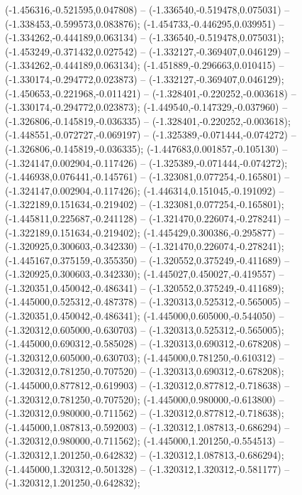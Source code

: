  (-1.456316,-0.521595,0.047808) -- (-1.336540,-0.519478,0.075031) -- (-1.338453,-0.599573,0.083876);
 (-1.454733,-0.446295,0.039951) -- (-1.334262,-0.444189,0.063134) -- (-1.336540,-0.519478,0.075031);
 (-1.453249,-0.371432,0.027542) -- (-1.332127,-0.369407,0.046129) -- (-1.334262,-0.444189,0.063134);
 (-1.451889,-0.296663,0.010415) -- (-1.330174,-0.294772,0.023873) -- (-1.332127,-0.369407,0.046129);
 (-1.450653,-0.221968,-0.011421) -- (-1.328401,-0.220252,-0.003618) -- (-1.330174,-0.294772,0.023873);
 (-1.449540,-0.147329,-0.037960) -- (-1.326806,-0.145819,-0.036335) -- (-1.328401,-0.220252,-0.003618);
 (-1.448551,-0.072727,-0.069197) -- (-1.325389,-0.071444,-0.074272) -- (-1.326806,-0.145819,-0.036335);
 (-1.447683,0.001857,-0.105130) -- (-1.324147,0.002904,-0.117426) -- (-1.325389,-0.071444,-0.074272);
 (-1.446938,0.076441,-0.145761) -- (-1.323081,0.077254,-0.165801) -- (-1.324147,0.002904,-0.117426);
 (-1.446314,0.151045,-0.191092) -- (-1.322189,0.151634,-0.219402) -- (-1.323081,0.077254,-0.165801);
 (-1.445811,0.225687,-0.241128) -- (-1.321470,0.226074,-0.278241) -- (-1.322189,0.151634,-0.219402);
 (-1.445429,0.300386,-0.295877) -- (-1.320925,0.300603,-0.342330) -- (-1.321470,0.226074,-0.278241);
 (-1.445167,0.375159,-0.355350) -- (-1.320552,0.375249,-0.411689) -- (-1.320925,0.300603,-0.342330);
 (-1.445027,0.450027,-0.419557) -- (-1.320351,0.450042,-0.486341) -- (-1.320552,0.375249,-0.411689);
 (-1.445000,0.525312,-0.487378) -- (-1.320313,0.525312,-0.565005) -- (-1.320351,0.450042,-0.486341);
 (-1.445000,0.605000,-0.544050) -- (-1.320312,0.605000,-0.630703) -- (-1.320313,0.525312,-0.565005);
 (-1.445000,0.690312,-0.585028) -- (-1.320313,0.690312,-0.678208) -- (-1.320312,0.605000,-0.630703);
 (-1.445000,0.781250,-0.610312) -- (-1.320312,0.781250,-0.707520) -- (-1.320313,0.690312,-0.678208);
 (-1.445000,0.877812,-0.619903) -- (-1.320312,0.877812,-0.718638) -- (-1.320312,0.781250,-0.707520);
 (-1.445000,0.980000,-0.613800) -- (-1.320312,0.980000,-0.711562) -- (-1.320312,0.877812,-0.718638);
 (-1.445000,1.087813,-0.592003) -- (-1.320312,1.087813,-0.686294) -- (-1.320312,0.980000,-0.711562);
 (-1.445000,1.201250,-0.554513) -- (-1.320312,1.201250,-0.642832) -- (-1.320312,1.087813,-0.686294);
 (-1.445000,1.320312,-0.501328) -- (-1.320312,1.320312,-0.581177) -- (-1.320312,1.201250,-0.642832);
